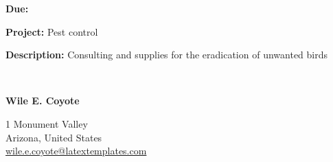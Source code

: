 \documentclass[
	a4paper, %
	9pt, %
]{CSMinimalInvoice}
\begin{document}
\begin{minipage}[t]{0.5\textwidth}
	\textbf{Due:}  %
	
	\textbf{Project:} Pest control %
	
	\textbf{Description:} Consulting and supplies for the eradication of unwanted birds %
\end{minipage}
\begin{minipage}[t]{0.03\textwidth}
	~ %
\end{minipage}
\begin{minipage}[t]{0.5\textwidth}
	\textbf{Wile E. Coyote} %
	
	1 Monument Valley \\ %
	Arizona, United States \\
	\href{mailto:wile.e.coyote@latextemplates.com}{wile.e.coyote@latextemplates.com} %
\end{minipage}



\vfill %



\begin{invoicetable}
\end{invoicetable}
\end{document}

